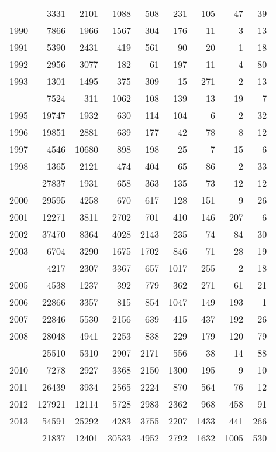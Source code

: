 \documentclass[
]{article}
\begin{document}
\begin{longtable}[t]{lrrrrrrrr}
\endfoot
\bottomrule
\endlastfoot
1989 & 3331 & 2101 & 1088 & 508 & 231 & 105 & 47 & 39\\
1990 & 7866 & 1966 & 1567 & 304 & 176 & 11 & 3 & 13\\
1991 & 5390 & 2431 & 419 & 561 & 90 & 20 & 1 & 18\\
1992 & 2956 & 3077 & 182 & 61 & 197 & 11 & 4 & 80\\
1993 & 1301 & 1495 & 375 & 309 & 15 & 271 & 2 & 13\\
\addlinespace
1994 & 7524 & 311 & 1062 & 108 & 139 & 13 & 19 & 7\\
1995 & 19747 & 1932 & 630 & 114 & 104 & 6 & 2 & 32\\
1996 & 19851 & 2881 & 639 & 177 & 42 & 78 & 8 & 12\\
1997 & 4546 & 10680 & 898 & 198 & 25 & 7 & 15 & 6\\
1998 & 1365 & 2121 & 474 & 404 & 65 & 86 & 2 & 33\\
\addlinespace
1999 & 27837 & 1931 & 658 & 363 & 135 & 73 & 12 & 12\\
2000 & 29595 & 4258 & 670 & 617 & 128 & 151 & 9 & 26\\
2001 & 12271 & 3811 & 2702 & 701 & 410 & 146 & 207 & 6\\
2002 & 37470 & 8364 & 4028 & 2143 & 235 & 74 & 84 & 30\\
2003 & 6704 & 3290 & 1675 & 1702 & 846 & 71 & 28 & 19\\
\addlinespace
2004 & 4217 & 2307 & 3367 & 657 & 1017 & 255 & 2 & 18\\
2005 & 4538 & 1237 & 392 & 779 & 362 & 271 & 61 & 21\\
2006 & 22866 & 3357 & 815 & 854 & 1047 & 149 & 193 & 1\\
2007 & 22846 & 5530 & 2156 & 639 & 415 & 437 & 192 & 26\\
2008 & 28048 & 4941 & 2253 & 838 & 229 & 179 & 120 & 79\\
\addlinespace
2009 & 25510 & 5310 & 2907 & 2171 & 556 & 38 & 14 & 88\\
2010 & 7278 & 2927 & 3368 & 2150 & 1300 & 195 & 9 & 10\\
2011 & 26439 & 3934 & 2565 & 2224 & 870 & 564 & 76 & 12\\
2012 & 127921 & 12114 & 5728 & 2983 & 2362 & 968 & 458 & 91\\
2013 & 54591 & 25292 & 4283 & 3755 & 2207 & 1433 & 441 & 266\\
\addlinespace
2014 & 21837 & 12401 & 30533 & 4952 & 2792 & 1632 & 1005 & 530\\

\end{longtable}
\end{document}
